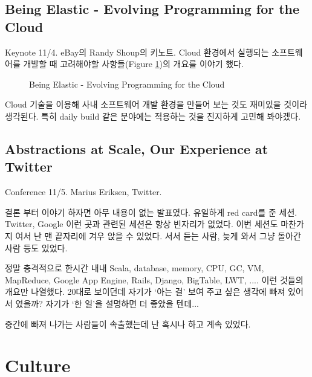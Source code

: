 \documentclass[11pt]{article}
\begin{document}
\subsection{Being Elastic - Evolving Programming for the Cloud}

Keynote 11/4. eBay의 Randy Shoup의 키노트.
Cloud 환경에서 실행되는 소프트웨어를 개발할 때
고려해야할 사항들(Figure \ref{cloud})의 개요를 이야기 했다.


\begin{figure}[t]
    \begin{Frame}
        \begin{center}
        \end{center}
    \end{Frame}
    \caption{Being Elastic - Evolving Programming for the Cloud}
    \label{cloud}
\end{figure}

Cloud 기술을 이용해 사내 소프트웨어 개발 환경을 만들어 보는 것도 재미있을 
것이라 생각된다. 특히 daily build 같은 분야에는 적용하는 것을 진지하게 
고민해 봐야겠다.

\subsection{Abstractions at Scale, Our Experience at Twitter}

Conference 11/5. Marius Eriksen, Twitter.

결론 부터 이야기 하자면 아무 내용이 없는 발표였다. 유일하게 red card를
준 세션.
Twitter, Google 이런 곳과 관련된 세션은 항상 빈자리가 없었다. 이번
세션도 마찬가지 여서 난 맨 끝자리에 겨우 앉을 수 있었다. 서서 듣는
사람, 늦게 와서 그냥 돌아간 사람 등도 있었다.
 
정말 충격적으로 한시간 내내 Scala, database, memory, CPU, GC, VM,
MapReduce, Google App Engine, Rails, Django, BigTable, LWT, .... 이런
것들의 개요만 나열했다.
20대로 보이던데 자기가 `아는 걸' 보여 주고 싶은 생각에 빠져 있어서
였을까? 자기가 `한 일'을 설명하면 더 좋았을 텐데...
 
중간에 빠져 나가는 사람들이 속출했는데 난 혹시나 하고 계속 있었다. 

\section{Culture}
\end{document}
